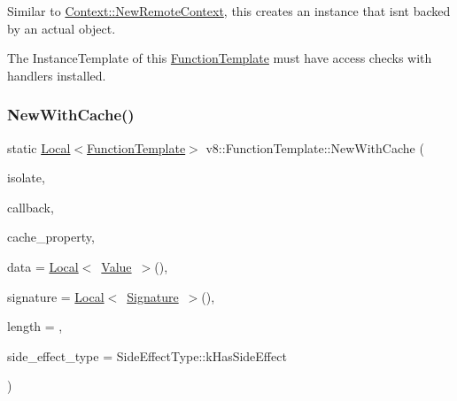 Similar to \mbox{\hyperlink{classv8_1_1Context_a3227e740cb2e611c6706e0a65bc34d10}{Context\+::\+New\+Remote\+Context}}, this creates an instance that isn\textquotesingle{}t backed by an actual object.

The Instance\+Template of this \mbox{\hyperlink{classv8_1_1FunctionTemplate}{Function\+Template}} must have access checks with handlers installed. \mbox{\label{classv8_1_1FunctionTemplate_a0718db9d9b5ca6e37899ec15b208c0ba}} 
\subsubsection{\texorpdfstring{New\+With\+Cache()}{NewWithCache()}}
{\footnotesize\ttfamily static \mbox{\hyperlink{classv8_1_1Local}{Local}}$<$\mbox{\hyperlink{classv8_1_1FunctionTemplate}{Function\+Template}}$>$ v8\+::\+Function\+Template\+::\+New\+With\+Cache (\begin{DoxyParamCaption}\item[{\mbox{\hyperlink{classv8_1_1Isolate}{Isolate}} $\ast$}]{isolate,  }\item[{Function\+Callback}]{callback,  }\item[{\mbox{\hyperlink{classv8_1_1Local}{Local}}$<$ \mbox{\hyperlink{classv8_1_1Private}{Private}} $>$}]{cache\+\_\+property,  }\item[{\mbox{\hyperlink{classv8_1_1Local}{Local}}$<$ \mbox{\hyperlink{classv8_1_1Value}{Value}} $>$}]{data = {\ttfamily \mbox{\hyperlink{classv8_1_1Local}{Local}}$<$~\mbox{\hyperlink{classv8_1_1Value}{Value}}~$>$()},  }\item[{\mbox{\hyperlink{classv8_1_1Local}{Local}}$<$ \mbox{\hyperlink{classv8_1_1Signature}{Signature}} $>$}]{signature = {\ttfamily \mbox{\hyperlink{classv8_1_1Local}{Local}}$<$~\mbox{\hyperlink{classv8_1_1Signature}{Signature}}~$>$()},  }\item[{int}]{length = {},  }\item[{\mbox{\hyperlink{namespacev8_a29711319c2b9fc7716d65faee2f7b9cb}{Side\+Effect\+Type}}}]{side\+\_\+effect\+\_\+type = {\ttfamily SideEffectType\+:\+:kHasSideEffect} }\end{DoxyParamCaption})\hspace{0.3cm}{\ttfamily [static]}}

